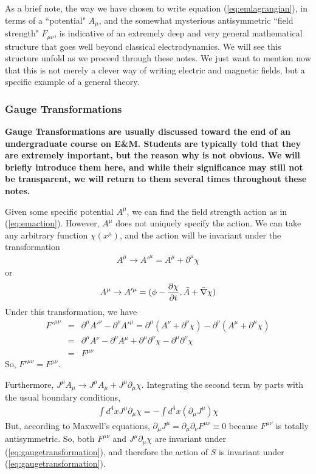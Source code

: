 \documentclass[12pt,epsf]{article}
\def\nolabel{\nonumber }
\def\nolabel{\nonumber }
\begin{document}
As a brief note, the way we have chosen to write equation
(\ref{eq:emlagrangian}), in terms of a ``potential" $A_{\mu}$, and the
somewhat mysterious antisymmetric ``field strength" $F_{\mu \nu}$, is
indicative of an extremely deep and very general mathematical structure
that goes well beyond classical electrodynamics.  We will see this
structure unfold as we proceed through these notes.  We just want to
mention now that this is not merely a clever way of writing electric
and magnetic fields, but a specific example of a general theory.  

\subsubsection{Gauge Transformations}

\bf Gauge Transformations \rm are usually discussed toward the end of an
undergraduate course on E\&M.  Students are typically told that they
are extremely important, but the reason why is not obvious.  We will
briefly introduce them here, and while their significance may still not
be transparent, we will return to them several times throughout these
notes.	

Given some specific potential $A^{\mu}$, we can find the field strength
action as in (\ref{eq:emaction}).  However, $A^{\mu}$ does not uniquely
specify the action.  We can take any arbitrary function
$\chi(x^{\mu})$, and the action will be invariant under the
transformation
\begin{eqnarray}
A^{\mu} \rightarrow A'^{\mu} = A^{\mu} + \partial^{\mu}\chi
\label{eq:gaugetransformation}
\end{eqnarray}
or 
\begin{eqnarray}
A^{\mu} \rightarrow A'^{\mu} = (\phi - {\partial \chi \over \partial
t}, \bar A + \bar \nabla \chi) \nolabel
\end{eqnarray}
Under this transformation, we have 
\begin{eqnarray}
F'^{\mu \nu} &=& \partial^{\mu}A'^{\nu} - \partial^{\nu}A'^{\mu} =
\partial^{\mu}(A^{\nu}+\partial^{\nu}\chi) - \partial^{\nu}(A^{\mu}+
\partial^{\mu}\chi) \nolabel \\
&=& \partial^{\mu}A^{\nu} - \partial^{\nu}A^{\mu} + \partial^{\mu}
\partial^{\nu}\chi -\partial^{\mu}\partial^{\nu}\chi \nolabel \\
&=& F^{\mu \nu}
\label{eq:invarianceoffmn}
\end{eqnarray}
So, $F'^{\mu \nu} = F^{\mu \nu}$.  

Furthermore, $J^{\mu}A_{\mu} \rightarrow J^{\mu}A_{\mu} +
J^{\mu}\partial_{\mu}\chi$.  Integrating the second term by parts with
the usual boundary conditions, 
\begin{eqnarray}
\int d^4x J^{\mu}\partial_{\mu}\chi = -\int d^4x
(\partial_{\mu}J^{\mu})\chi \nolabel
\end{eqnarray}
But, according to Maxwell's equations, $\partial_{\mu}J^{\mu} =
\partial_{\mu}\partial_{\nu}F^{\mu \nu} \equiv 0$ because $F^{\mu \nu}$
is totally antisymmetric.  So, both $F^{\mu \nu}$ and
$J^{\mu}\partial_{\mu}\chi$ are invariant under
(\ref{eq:gaugetransformation}), and therefore the action of $S$ is
invariant under (\ref{eq:gaugetransformation}).  
\end{document}
